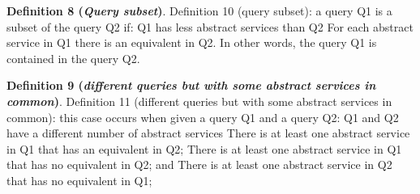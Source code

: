 \bigskip
\noindent \textbf{Definition 8 (\textsl{Query subset})}.
Definition 10 (query subset): a query Q1 is a subset of the query Q2 if: 
Q1 has less abstract services than Q2
For each abstract service in Q1 there is an equivalent in Q2.
In other words, the query Q1 is contained in the query Q2.

\bigskip
\noindent \textbf{Definition 9 (\textsl{different queries but with some abstract services in common})}.
Definition 11 (different queries but with some abstract services in common): this case occurs when given a query Q1 and a query Q2: 
Q1 and Q2 have a different number of abstract services
There is at least one abstract service in Q1 that has an equivalent in Q2;
There is at least one abstract service in Q1 that has no equivalent in Q2; and
There is at least one abstract service in Q2 that has no equivalent in Q1;
